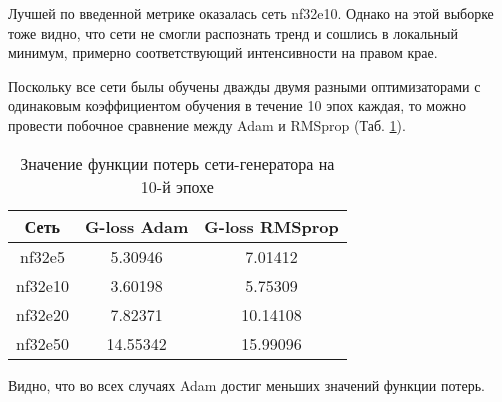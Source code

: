 			Лучшей по введенной метрике оказалась сеть nf32e10. Однако на этой выборке тоже видно, что сети не смогли распознать тренд и сошлись в локальный минимум, примерно соответствующий интенсивности на правом крае.
			
			Поскольку все сети былы обучены дважды двумя разными оптимизаторами с одинаковым коэффициентом обучения в течение 10 эпох каждая, то можно провести побочное сравнение между Adam и RMSprop (Таб. \ref{8-adam-rms}).
			
			\begin{table}[h!]
				\begin{center}
					\begin{tabular}{|c|c|c|}
						\hline
						Сеть & G-loss Adam & G-loss RMSprop \\
						\hline
						nf32e5 & 5.30946 & 7.01412\\
						\hline
						nf32e10 & 3.60198 & 5.75309\\
						\hline
						nf32e20 & 7.82371 & 10.14108\\
						\hline
						nf32e50 & 14.55342 & 15.99096\\
						\hline
					\end{tabular}
					\caption{Значение функции потерь сети-генератора на 10-й эпохе}
					\label{8-adam-rms}
				\end{center}
			\end{table}
			
			Видно, что во всех случаях Adam достиг меньших значений функции потерь.